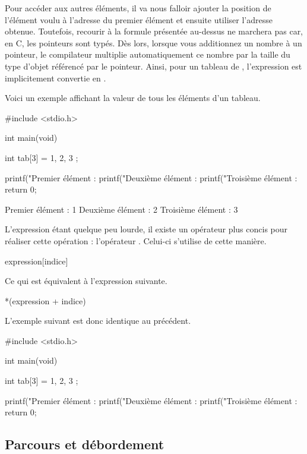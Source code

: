 Pour accéder aux autres éléments, il va nous falloir ajouter la position
de l'élément voulu à l'adresse du premier élément et ensuite utiliser
l'adresse obtenue. Toutefois, recourir à la formule présentée au-dessus
ne marchera pas car, en C, les pointeurs sont typés. Dès lors, lorsque
vous additionnez un nombre à un pointeur, le compilateur multiplie
automatiquement ce nombre par la taille du type d'objet référencé par le
pointeur. Ainsi, pour un tableau de , l'expression
 est implicitement convertie en
.

Voici un exemple affichant la valeur de tous les éléments d'un tableau.

\begin{C}
#include <stdio.h>


int main(void)
{
    int tab[3] = { 1, 2, 3 };

    printf("Premier élément : %
    printf("Deuxième élément : %
    printf("Troisième élément : %
    return 0;
}
\end{C}

\begin{C}
Premier élément : 1
Deuxième élément : 2
Troisième élément : 3
\end{C}

L'expression  étant quelque peu lourde, il existe
un opérateur plus concis pour réaliser cette opération : l'opérateur
\mybox{{[}{]}}. Celui-ci s'utilise de cette manière.

\begin{C}
expression[indice]
\end{C}

Ce qui est équivalent à l'expression suivante.

\begin{C}
*(expression + indice)
\end{C}

L'exemple suivant est donc identique au précédent.

\begin{C}
#include <stdio.h>


int main(void)
{
    int tab[3] = { 1, 2, 3 };

    printf("Premier élément : %
    printf("Deuxième élément : %
    printf("Troisième élément : %
    return 0;
}
\end{C}

\subsection{Parcours et débordement}
\label{parcours-et-debordement}

